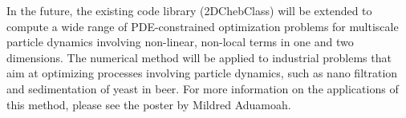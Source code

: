 \documentclass[a0,portrait]{a0poster}
\begin{document}
\begin{multicols}{2}
In the future, the existing code library (2DChebClass) \cite{GoddardPseudospectralCode1} will be extended to compute a wide range of PDE-constrained optimization problems for multiscale particle dynamics involving non-linear, non-local terms in one and two dimensions. 
The numerical method will be applied to industrial problems that aim at optimizing processes involving particle dynamics, such as nano filtration and sedimentation of yeast in beer.
For more information on the applications of this method, please see the poster by Mildred Aduamoah.
\thispagestyle{empty}




\end{multicols}
\end{document}
